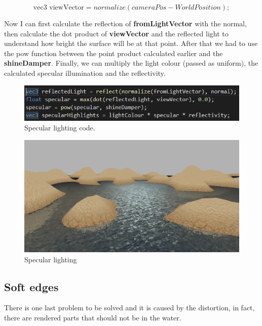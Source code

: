 \begin{equation}
\text{vec3 viewVector} = normalize(cameraPos - WorldPosition);
\end{equation}

\noindent
Now I can first calculate the reflection of \textbf{fromLightVector} with the normal, then calculate the dot product of \textbf {viewVector} and the reflected light to understand how bright the surface will be at that point. After that we had to use the pow function between the point product calculated earlier and the \textbf{shineDamper}. Finally, we can multiply the light colour (passed as uniform), the calculated specular illumination and the reflectivity.

\begin{figure}[hbt!]
	\centering
	\includegraphics[width= 1
	\textwidth]{images/Light.png}
	\caption{Specular lighting code.}
	\label{fig::highlights}
\end{figure} 

\begin{figure}[hbt!]
	\centering
	\includegraphics[width= 1
	\textwidth]{images/Water5.png}
	\caption{Specular lighting}
\end{figure} 

\subsection{Soft edges}
There is one last problem to be solved and it is caused by the distortion, in fact, there are rendered parts that should not be in the water.

\newpage

